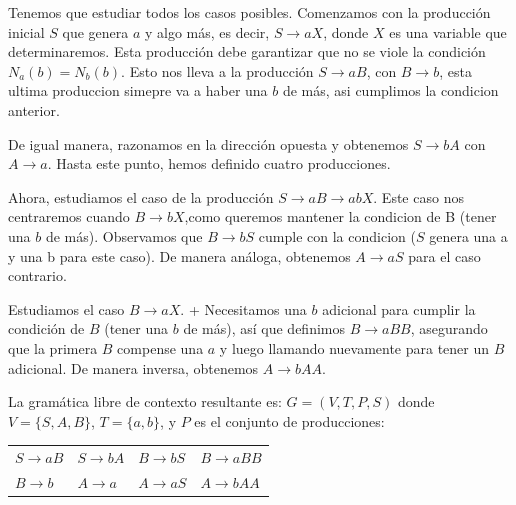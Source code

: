 \documentclass{article}
\begin{document}
            Tenemos que estudiar todos los casos posibles. Comenzamos con la producción inicial $S$ que genera $a$ y algo más, es decir, $S \rightarrow aX$, donde $X$ es una variable que determinaremos. 
            Esta producción debe garantizar que no se viole la condición $N_a(b) = N_b(b)$. Esto nos lleva a la producción $S \rightarrow aB$, 
            con $B \rightarrow b$, esta ultima produccion simepre va a haber una $b$ de más, asi cumplimos la condicion anterior.
            \vspace{\baselineskip} %

            De igual manera, razonamos en la dirección opuesta 
            y obtenemos $S \rightarrow bA$ con $A \rightarrow a$. 
            Hasta este punto, hemos definido cuatro producciones.
            \vspace{\baselineskip} %

            Ahora, estudiamos el caso de la producción $S \rightarrow aB \rightarrow abX$. Este caso nos centraremos cuando $B \rightarrow bX$,como queremos mantener la 
            condicion de B (tener una $b$ de más). Observamos que $B \rightarrow bS$ cumple con la condicion ($S$ genera una a y una b para este caso). 
            De manera análoga, obtenemos $A \rightarrow aS$ para el caso contrario.
            \vspace{\baselineskip} %

            Estudiamos el caso $B \rightarrow aX$. +
            Necesitamos una $b$ adicional para cumplir la condición de $B$ (tener una $b$ de más), 
            así que definimos $B \rightarrow aBB$, asegurando que la primera 
            $B$ compense una $a$ y luego llamando nuevamente para tener un $B$ 
            adicional. De manera inversa, obtenemos $A \rightarrow bAA$.
            \vspace{\baselineskip} %

            La gramática libre de contexto resultante es:
            \vspace{\baselineskip} %
            $G = (V, T, P, S)$ donde $V = \{S, A, B\}$, $T = \{a, b\}$, y $P$ es el conjunto de producciones:
            \vspace{\baselineskip} %

            \begin{tabularx}{\textwidth}{XXXX}
                $S \rightarrow aB$ & $S \rightarrow bA$ & $B \rightarrow bS$ & $B \rightarrow aBB$\\
                $B \rightarrow b$ & $A \rightarrow a$ & $A \rightarrow aS$ & $A \rightarrow bAA$\\
            \end{tabularx}
\end{document}
